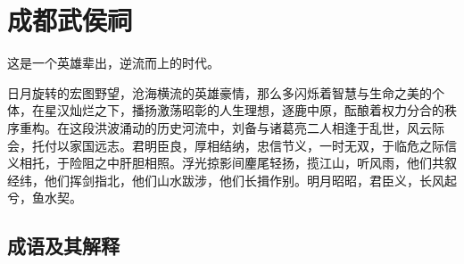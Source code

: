 \newpage

\section*{成都武侯祠}

这是一个英雄辈出，逆流而上的时代。

日月旋转的宏图野望，沧海横流的英雄豪情，那么多闪烁着智慧与生命之美的个体，在星汉灿烂之下，播扬激荡昭彰的人生理想，逐鹿中原，酝酿着权力分合的秩序重构。在这段洪波涌动的历史河流中，刘备与诸葛亮二人相逢于乱世，风云际会，托付以家国远志。君明臣良，厚相结纳，忠信节义，一时无双，于临危之际信义相托，于险阻之中肝胆相照。浮光掠影间麈尾轻扬，揽江山，听风雨，他们共叙经纬，他们挥剑指北，他们山水跋涉，他们长揖作别。明月昭昭，君臣义，长风起兮，鱼水契。

\subsection*{成语及其解释}

